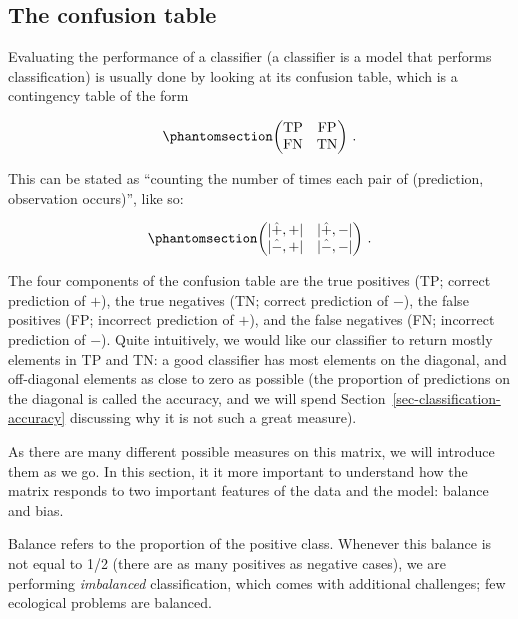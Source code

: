 \documentclass[
  letterpaper,
]{scrbook}
\begin{document}
\subsection{The confusion table}\label{the-confusion-table}

Evaluating the performance of a classifier (a classifier is a model that
performs classification) is usually done by looking at its confusion
table, which is a contingency table of the form

\begin{equation}\phantomsection\label{eq-classification-confusion}{
\begin{pmatrix}
\text{TP} & \text{FP}\\
\text{FN} & \text{TN} 
\end{pmatrix} \,.
}\end{equation}

This can be stated as ``counting the number of times each pair of
(prediction, observation occurs)'', like so:

\begin{equation}\phantomsection\label{eq-classification-explain}{
\begin{pmatrix}
|\hat +, +| & |\hat +, -|\\
|\hat -, +| & |\hat -, -| 
\end{pmatrix} \,.
}\end{equation}

The four components of the confusion table are the true positives (TP;
correct prediction of \(+\)), the true negatives (TN; correct prediction
of \(-\)), the false positives (FP; incorrect prediction of \(+\)), and
the false negatives (FN; incorrect prediction of \(-\)). Quite
intuitively, we would like our classifier to return mostly elements in
TP and TN: a good classifier has most elements on the diagonal, and
off-diagonal elements as close to zero as possible (the proportion of
predictions on the diagonal is called the accuracy, and we will spend
Section~\ref{sec-classification-accuracy} discussing why it is not such
a great measure).

As there are many different possible measures on this matrix, we will
introduce them as we go. In this section, it it more important to
understand how the matrix responds to two important features of the data
and the model: balance and bias.

Balance refers to the proportion of the positive class. Whenever this
balance is not equal to 1/2 (there are as many positives as negative
cases), we are performing \emph{imbalanced} classification, which comes
with additional challenges; few ecological problems are balanced.
\end{document}
